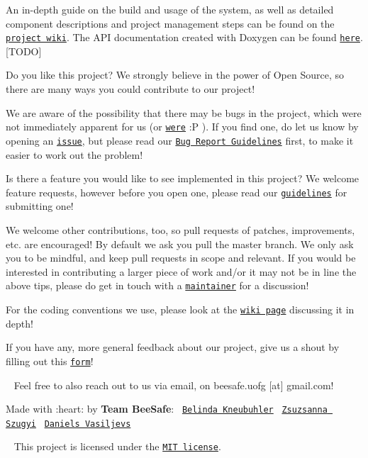 An in-\/depth guide on the build and usage of the system, as well as detailed component descriptions and project management steps can be found on the \href{https://github.com/itsBelinda/ENG5220-2020-Team13/wiki}{\tt project wiki}. The A\+PI documentation created with Doxygen can be found \href{}{\tt here}. \mbox{[}T\+O\+DO\mbox{]}

Do you like this project? We strongly believe in the power of Open Source, so there are many ways you could contribute to our project!

We are aware of the possibility that there may be bugs in the project, which were not immediately apparent for us (or \href{https://github.com/itsBelinda/ENG5220-2020-Team13/wiki/Project-Management%3A-Further-Work}{\tt were} \+:P ). If you find one, do let us know by opening an \href{https://github.com/itsBelinda/ENG5220-2020-Team13/issues}{\tt issue}, but please read our \href{https://github.com/itsBelinda/ENG5220-2020-Team13/blob/master/.github/ISSUE_TEMPLATE/bug_report.md}{\tt Bug Report Guidelines} first, to make it easier to work out the problem!

Is there a feature you would like to see implemented in this project? We welcome feature requests, however before you open one, please read our \href{https://github.com/itsBelinda/ENG5220-2020-Team13/blob/master/.github/ISSUE_TEMPLATE/feature_request.md}{\tt guidelines} for submitting one!

We welcome other contributions, too, so pull requests of patches, improvements, etc. are encouraged! By default we ask you pull the {\ttfamily master} branch. We only ask you to be mindful, and keep pull requests in scope and relevant. If you would be interested in contributing a larger piece of work and/or it may not be in line the above tips, please do get in touch with a \href{https://github.com/itsBelinda/ENG5220-2020-Team13/blob/master/README.md#credits}{\tt maintainer} for a discussion!

For the coding conventions we use, please look at the \href{https://github.com/itsBelinda/ENG5220-2020-Team13/wiki/Contributions#coding-conventions}{\tt wiki page} discussing it in depth!

If you have any, more general feedback about our project, give us a shout by filling out this \href{https://forms.gle/tGHM2jB7GBWfdgk3A}{\tt form}!

~\newline
 Feel free to also reach out to us via email, on beesafe.\+uofg \mbox{[}at\mbox{]} gmail.\+com!

Made with \+:heart\+: by {\bfseries Team Bee\+Safe}\+:~\newline
 \href{https://github.com/itsBelinda/}{\tt Belinda Kneubuhler}~\newline
 \href{https://github.com/szugyizs/}{\tt Zsuzsanna Szugyi}~\newline
 \href{https://github.com/dans-acc/}{\tt Daniels Vasiljevs}~\newline


\href{https://opensource.org/licenses/MIT}{\tt } ~\newline
 This project is licensed under the \href{https://github.com/itsBelinda/ENG5220-2020-Team13/blob/master/LICENSE}{\tt M\+IT license}. 